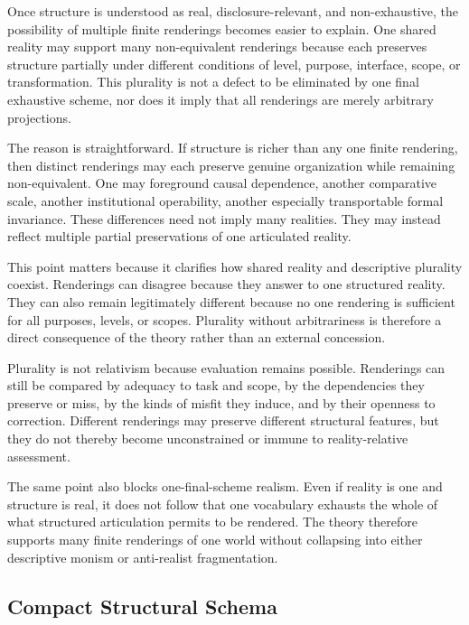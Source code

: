 \documentclass[11pt]{article}
\begin{document}
Once structure is understood as real, disclosure-relevant, and non-exhaustive, the possibility of multiple finite renderings becomes easier to explain. One shared reality may support many non-equivalent renderings because each preserves structure partially under different conditions of level, purpose, interface, scope, or transformation. This plurality is not a defect to be eliminated by one final exhaustive scheme, nor does it imply that all renderings are merely arbitrary projections. \cite{Massimi2022PerspectivalRealism,Chang2022RealismForRealisticPeople}

The reason is straightforward. If structure is richer than any one finite rendering, then distinct renderings may each preserve genuine organization while remaining non-equivalent. One may foreground causal dependence, another comparative scale, another institutional operability, another especially transportable formal invariance. These differences need not imply many realities. They may instead reflect multiple partial preservations of one articulated reality.

This point matters because it clarifies how shared reality and descriptive plurality coexist. Renderings can disagree because they answer to one structured reality. They can also remain legitimately different because no one rendering is sufficient for all purposes, levels, or scopes. Plurality without arbitrariness is therefore a direct consequence of the theory rather than an external concession.

Plurality is not relativism because evaluation remains possible. Renderings can still be compared by adequacy to task and scope, by the dependencies they preserve or miss, by the kinds of misfit they induce, and by their openness to correction. Different renderings may preserve different structural features, but they do not thereby become unconstrained or immune to reality-relative assessment.

The same point also blocks one-final-scheme realism. Even if reality is one and structure is real, it does not follow that one vocabulary exhausts the whole of what structured articulation permits to be rendered. The theory therefore supports many finite renderings of one world without collapsing into either descriptive monism or anti-realist fragmentation.

\subsection{Compact Structural Schema}
\end{document}
